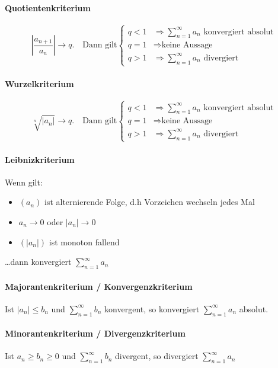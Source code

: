 \paragraph{Quotientenkriterium}
\[
\left| \frac{a_{n+1}}{a_n} \right| \to q. \quad \text{Dann gilt} \begin{cases}
q < 1 & \Rightarrow \sum_{n=1}^\infty a_n \text{ konvergiert absolut} \\
q = 1 & \Rightarrow \text{keine Aussage}\\
q > 1 & \Rightarrow \sum_{n=1}^\infty a_n \text{ divergiert}
\end{cases}
\]

\paragraph{Wurzelkriterium}
\[
\sqrt[n]{\left | a_n \right |} \to q. \quad \text{Dann gilt} \begin{cases}
q < 1 & \Rightarrow \sum_{n=1}^\infty a_n \text{ konvergiert absolut}\\
q = 1 & \Rightarrow \text{keine Aussage}\\
q > 1 & \Rightarrow \sum_{n=1}^\infty a_n \text{ divergiert}
\end{cases}
\]

\paragraph{Leibnizkriterium}
\vspace{-0.3cm}
{\small
Wenn gilt:
\begin{itemize}
  \item $(a_n)$ ist alternierende Folge, d.h Vorzeichen wechseln jedes Mal
  \item $a_n \to 0$ oder $|a_n| \to 0$
  \item $(|a_n|)$ ist monoton fallend
\end{itemize}
\ldots dann konvergiert $\sum_{n=1}^\infty a_n$}

\paragraph{Majorantenkriterium / Konvergenzkriterium}
\vspace{-0.2cm}
Ist $|a_n| \leq b_n$ und $\sum_{n=1}^\infty b_n$ konvergent, so konvergiert
$\sum_{n=1}^\infty a_n$ absolut.

\paragraph{Minorantenkriterium / Divergenzkriterium}
\vspace{-0.2cm}
Ist $a_n \geq b_n \geq 0$ und $\sum_{n=1}^\infty b_n$ divergent, so divergiert
$\sum_{n=1}^\infty a_n$

